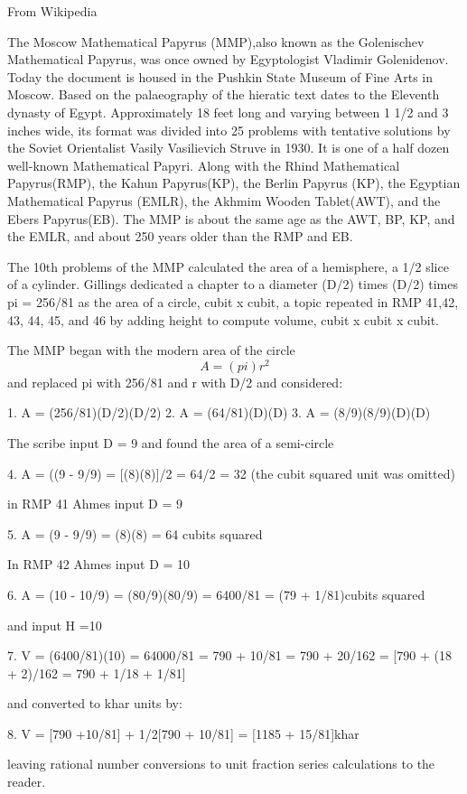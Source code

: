 \documentclass[12pt]{article}
\begin{document}
From Wikipedia

The Moscow Mathematical Papyrus (MMP),also known as the Golenischev Mathematical Papyrus, was once owned by Egyptologist Vladimir Golenidenov. Today the document is housed in the Pushkin State Museum of Fine Arts in Moscow. Based on the palaeography of the hieratic text dates to the Eleventh dynasty of Egypt. Approximately 18 feet long and varying between 1 1/2 and 3 inches wide, its format was divided into 25 problems with tentative solutions by the Soviet Orientalist Vasily Vasilievich Struve in 1930. It is one of a half dozen well-known Mathematical Papyri. Along with the Rhind Mathematical Papyrus(RMP), the Kahun Papyrus(KP), the Berlin Papyrus (KP), the Egyptian Mathematical Papyrus (EMLR), the Akhmim Wooden Tablet(AWT), and the Ebers Papyrus(EB). The MMP is about the same age as the AWT, BP, KP, and the EMLR, and about 250 years older than the RMP and EB.

The 10th problems of the MMP calculated the area of a hemisphere, a 1/2 slice of a cylinder. Gillings dedicated a chapter to a diameter (D/2) times (D/2) times pi = 256/81 as the area of a circle, cubit x cubit, a topic repeated in RMP 41,42, 43, 44, 45, and 46 by adding height to compute volume, cubit x cubit x cubit.

The MMP began with the modern area of the circle $$ A = (pi)r^2$$ and replaced pi with 256/81 and r with D/2 and considered:

1. A = (256/81)(D/2)(D/2)
2. A = (64/81)(D)(D)
3. A = (8/9)(8/9)(D)(D)

The scribe input D = 9 and found the area of a semi-circle

4. A = ((9 - 9/9) = [(8)(8)]/2 = 64/2 = 32 (the cubit squared unit was omitted)

in RMP 41 Ahmes input D = 9

5. A = (9 - 9/9) = (8)(8) = 64 cubits squared

In RMP 42 Ahmes input D = 10

6. A = (10 - 10/9) = (80/9)(80/9) = 6400/81 = (79 + 1/81)cubits squared

and input H =10

7. V = (6400/81)(10) = 64000/81 = 790 + 10/81 = 790 + 20/162 = [790 + (18 + 2)/162 = 790 + 1/18 + 1/81]

and converted to khar units by:

8. V = [790 +10/81] + 1/2[790 + 10/81] = [1185 + 15/81]khar 

leaving rational number conversions to unit fraction series calculations to the reader.    
\end{document}
